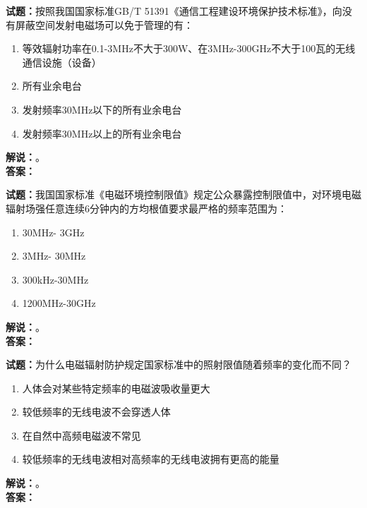\documentclass{ctexbook}
\begin{document}
\vspace{\baselineskip}

\noindent\textbf{试题：}按照我国国家标准GB/T 51391《通信工程建设环境保护技术标准》，向没有屏蔽空间发射电磁场可以免于管理的有：
\begin{enumerate}[leftmargin=3em]
  \item 等效辐射功率在0.1-3\unit{\MHz}不大于300W、在3\unit{\MHz}-300\unit{\GHz}不大于100瓦的无线通信设施（设备）
  \item 所有业余电台
  \item 发射频率30\unit{\MHz}以下的所有业余电台
  \item 发射频率30\unit{\MHz}以上的所有业余电台
\end{enumerate}
\noindent\textbf{解说：}\textbf{}。
\\\noindent\textbf{答案：}

\vspace{\baselineskip}

\noindent\textbf{试题：}我国国家标准《电磁环境控制限值》规定公众暴露控制限值中，对环境电磁辐射场强任意连续6分钟内的方均根值要求最严格的频率范围为：
\begin{enumerate}[leftmargin=3em]
  \item 30\unit{\MHz}- 3\unit{\GHz}
  \item 3\unit{\MHz}- 30\unit{\MHz}
  \item 300\unit{\kHz}-30\unit{\MHz}
  \item 1200\unit{\MHz}-30\unit{\GHz}
\end{enumerate}
\noindent\textbf{解说：}\textbf{}。\\\noindent\textbf{答案：}

\vspace{\baselineskip}

\noindent\textbf{试题：}为什么电磁辐射防护规定国家标准中的照射限值随着频率的变化而不同？
\begin{enumerate}[leftmargin=3em]
  \item 人体会对某些特定频率的电磁波吸收量更大
  \item 较低频率的无线电波不会穿透人体
  \item 在自然中高频电磁波不常见
  \item 较低频率的无线电波相对高频率的无线电波拥有更高的能量
\end{enumerate}
\noindent\textbf{解说：}\textbf{}。\\\noindent\textbf{答案：}

\vspace{\baselineskip}
\end{document}
